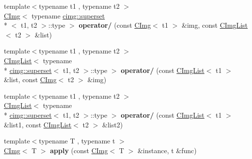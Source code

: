 \begin{DoxyCompactItemize}
\item 
\hypertarget{namespacecimg__library_afcc9952c9868bcc1506bea2147eb4ec7}{{\footnotesize template$<$typename t1 , typename t2 $>$ }\\\hyperlink{structcimg__library_1_1_c_img}{C\-Img}$<$ typename \hyperlink{structcimg__library_1_1cimg_1_1superset}{cimg\-::superset}\\*
$<$ t1, t2 $>$\-::type $>$ {\bfseries operator/} (const \hyperlink{structcimg__library_1_1_c_img}{C\-Img}$<$ t1 $>$ \&img, const \hyperlink{structcimg__library_1_1_c_img_list}{C\-Img\-List}$<$ t2 $>$ \&list)}\label{namespacecimg__library_afcc9952c9868bcc1506bea2147eb4ec7}

\item 
\hypertarget{namespacecimg__library_a87331013704c3ec204d35ebcab8f0061}{{\footnotesize template$<$typename t1 , typename t2 $>$ }\\\hyperlink{structcimg__library_1_1_c_img_list}{C\-Img\-List}$<$ typename \\*
\hyperlink{structcimg__library_1_1cimg_1_1superset}{cimg\-::superset}$<$ t1, t2 $>$\-::type $>$ {\bfseries operator/} (const \hyperlink{structcimg__library_1_1_c_img_list}{C\-Img\-List}$<$ t1 $>$ \&list, const \hyperlink{structcimg__library_1_1_c_img}{C\-Img}$<$ t2 $>$ \&img)}\label{namespacecimg__library_a87331013704c3ec204d35ebcab8f0061}

\item 
\hypertarget{namespacecimg__library_a051d47368d50ba9f292758cb54f8b5e8}{{\footnotesize template$<$typename t1 , typename t2 $>$ }\\\hyperlink{structcimg__library_1_1_c_img_list}{C\-Img\-List}$<$ typename \\*
\hyperlink{structcimg__library_1_1cimg_1_1superset}{cimg\-::superset}$<$ t1, t2 $>$\-::type $>$ {\bfseries operator/} (const \hyperlink{structcimg__library_1_1_c_img_list}{C\-Img\-List}$<$ t1 $>$ \&list1, const \hyperlink{structcimg__library_1_1_c_img_list}{C\-Img\-List}$<$ t2 $>$ \&list2)}\label{namespacecimg__library_a051d47368d50ba9f292758cb54f8b5e8}

\item 
\hypertarget{namespacecimg__library_a4dec6d0f2142f0688bece378ab0dcdea}{{\footnotesize template$<$typename T , typename t $>$ }\\\hyperlink{structcimg__library_1_1_c_img}{C\-Img}$<$ T $>$ {\bfseries apply} (const \hyperlink{structcimg__library_1_1_c_img}{C\-Img}$<$ T $>$ \&instance, t \&func)}\label{namespacecimg__library_a4dec6d0f2142f0688bece378ab0dcdea}


\end{DoxyCompactItemize}
